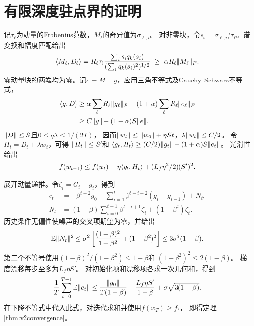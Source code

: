 \section{有限深度驻点界的证明}\label{app:v2convergence}
记$\tau_\ell$为动量的Frobenius范数，$M_\ell$的奇异值为$\sigma_{\ell,i}$。
对非零块，令$s_i=\sigma_{\ell,i}/\tau_\ell$。谱变换和幅度匹配给出
\[
 \langle M_\ell,D_\ell\rangle
   = R_\ell\tau_\ell\frac{\sum_i s_i q_k(s_i)}
                      {(\sum_i q_k(s_i)^2)^{1/2}}
   \ \ge\ \alpha R_\ell\lVert M_\ell\rVert_F .
\]
零动量块的两端均为零。记$e=M-g$，应用三角不等式及Cauchy--Schwarz不等式，
\begin{align}
 \langle g,D\rangle
 &\ge \alpha\sum_\ell R_\ell\lVert g_\ell\rVert_F
        -(1+\alpha)\sum_\ell R_\ell\lVert e_\ell\rVert_F\\
 &\ge C\lVert g\rVert-(1+\alpha)S\lVert e\rVert.
\end{align}
$\lVert D\rVert\le S$且$0\le\eta\lambda\le1/(2T)$，
因而$\lVert w_t\rVert\le\lVert w_0\rVert+\eta St$，$\lambda\lVert w_t\rVert\le C/2$。
令$H_t=D_t+\lambda w_t$，可得
$\lVert H_t\rVert\le S'$和
$\langle g_t,H_t\rangle\ge(C/2)\lVert g_t\rVert-(1+\alpha)S\lVert e_t\rVert$。
光滑性给出
\[
 f(w_{t+1})\le f(w_t)-\eta\langle g_t,H_t\rangle
                    +(L_f\eta^2/2)(S')^2 .
\]

展开动量递推。令$\zeta_i=G_i-g_i$，得到
\begin{align}
 e_t&=-\beta^{t+2}g_0-\sum_{i=1}^{t}\beta^{t-i+2}(g_i-g_{i-1})+N_t,\\
 N_t&=(1-\beta)\sum_{i=0}^{t-1}\beta^{t-i+1}\zeta_i
                     +(1-\beta^2)\zeta_t .
\end{align}
历史条件无偏性使噪声的交叉项期望为零，并给出
\[
 \mathbb E\lVert N_t\rVert^2
 \le \sigma^2\left[\frac{(1-\beta)^2}{1-\beta^2}+(1-\beta^2)^2\right]
 \le 3\sigma^2(1-\beta).
\]
第二个不等号使用$(1-\beta)^2/(1-\beta^2)\le1-\beta$和
$(1-\beta^2)^2\le2(1-\beta)$。
梯度漂移每步至多为$L_f\eta S'$。
对初始化项和漂移项各求一次几何和，得到
\[
 \frac1T\sum_{t=0}^{T-1}\mathbb E\lVert e_t\rVert
 \le \frac{\lVert g_0\rVert}{T(1-\beta)}
       +\frac{L_f\eta S'}{1-\beta}
       +\sigma\sqrt{3(1-\beta)}.
\]
在下降不等式中代入此式，对迭代求和并使用$f(w_T)\ge f_*$，
即得定理\ref{thm:v2convergence}。
